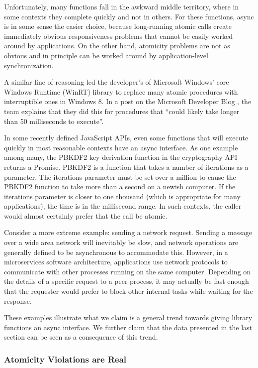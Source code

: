 \documentclass[acmsmall,anonymous,review]{acmart}\settopmatter{printfolios=true,printccs=false,printacmref=false}
\begin{document}
Unfortunately, many functions fall in the awkward middle territory, where in some contexts they complete quickly and not in others.
For these functions, async is in some sense the easier choice, because long-running atomic calls create immediately obvious responsiveness problems that cannot be easily worked around by applications.
On the other hand, atomicity problems are not as obvious and in principle can be worked around by application-level synchronization.

A similar line of reasoning led the developer's of Microsoft Windows' core Windows Runtime (WinRT) library to replace many atomic procedures with interruptible ones in Windows 8.
In a post on the Microsoft Developer Blog \cite{Windows8Team2012}, the team explains that they did this for procedures that ``could likely take longer than 50 milliseconds to execute''.

In some recently defined JavaScript APIs, even some functions that will execute quickly in most reasonable contexts have an async interface.
As one example among many, the PBKDF2 key derivation function in the cryptography API returns a Promise.
PBKDF2 is a function that takes a number of iterations as a parameter.
The iterations parameter must be set over a million to cause the PBKDF2 function to take more than a second on a newish computer.
If the iterations parameter is closer to one thousand (which is appropriate for many applications), the time is in the millisecond range.
In such contexts, the caller would almost certainly prefer that the call be atomic.

Consider a more extreme example: sending a network request.
Sending a message over a wide area network will inevitably be slow, and network operations are generally defined to be asynchronous to accommodate this.
However, in a microservices software architecture, applications use network protocols to communicate with other processes running on the same computer.
Depending on the details of a specific request to a peer process, it may actually be fast enough that the requester would prefer to block other internal tasks while waiting for the response.

These examples illustrate what we claim is a general trend towards giving library functions an async interface.
We further claim that the data presented in the last section can be seen as a consequence of this trend.

\subsubsection{Atomicity Violations are Real}
\end{document}
